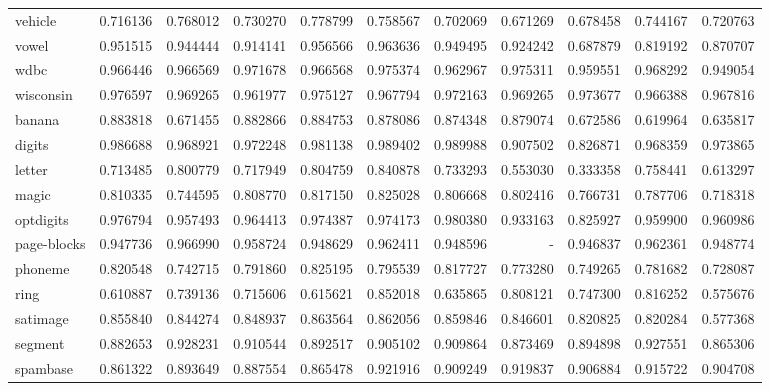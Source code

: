 \begin{tabular}{lrrrrrrrrrr}
vehicle         &   0.716136 &  0.768012 &  0.730270 &  0.778799 &  0.758567 &  0.702069 &  0.671269 &  0.678458 &  0.744167 &  0.720763 \\
vowel           &   0.951515 &  0.944444 &  0.914141 &  0.956566 &  0.963636 &  0.949495 &  0.924242 &  0.687879 &  0.819192 &  0.870707 \\
wdbc            &   0.966446 &  0.966569 &  0.971678 &  0.966568 &  0.975374 &  0.962967 &  0.975311 &  0.959551 &  0.968292 &  0.949054 \\
wisconsin       &   0.976597 &  0.969265 &  0.961977 &  0.975127 &  0.967794 &  0.972163 &  0.969265 &  0.973677 &  0.966388 &  0.967816 \\
banana          &   0.883818 &  0.671455 &  0.882866 &  0.884753 &  0.878086 &  0.874348 &  0.879074 &  0.672586 &  0.619964 &  0.635817 \\
digits          &   0.986688 &  0.968921 &  0.972248 &  0.981138 &  0.989402 &  0.989988 &  0.907502 &  0.826871 &  0.968359 &  0.973865 \\
letter          &   0.713485 &  0.800779 &  0.717949 &  0.804759 &  0.840878 &  0.733293 &  0.553030 &  0.333358 &  0.758441 &  0.613297 \\
magic           &   0.810335 &  0.744595 &  0.808770 &  0.817150 &  0.825028 &  0.806668 &  0.802416 &  0.766731 &  0.787706 &  0.718318 \\
optdigits       &   0.976794 &  0.957493 &  0.964413 &  0.974387 &  0.974173 &  0.980380 &  0.933163 &  0.825927 &  0.959900 &  0.960986 \\
page-blocks     &   0.947736 &  0.966990 &  0.958724 &  0.948629 &  0.962411 &  0.948596 &       - &  0.946837 &  0.962361 &  0.948774 \\
phoneme         &   0.820548 &  0.742715 &  0.791860 &  0.825195 &  0.795539 &  0.817727 &  0.773280 &  0.749265 &  0.781682 &  0.728087 \\
ring            &   0.610887 &  0.739136 &  0.715606 &  0.615621 &  0.852018 &  0.635865 &  0.808121 &  0.747300 &  0.816252 &  0.575676 \\
satimage        &   0.855840 &  0.844274 &  0.848937 &  0.863564 &  0.862056 &  0.859846 &  0.846601 &  0.820825 &  0.820284 &  0.577368 \\
segment         &   0.882653 &  0.928231 &  0.910544 &  0.892517 &  0.905102 &  0.909864 &  0.873469 &  0.894898 &  0.927551 &  0.865306 \\
spambase        &   0.861322 &  0.893649 &  0.887554 &  0.865478 &  0.921916 &  0.909249 &  0.919837 &  0.906884 &  0.915722 &  0.904708 \\

\end{tabular}
